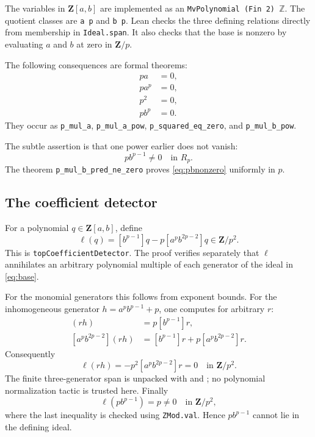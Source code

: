 \documentclass[11pt]{article}
\newcommand{\Z}{\mathbf Z}
\begin{document}
The variables in $\Z[a,b]$ are implemented as an
\texttt{MvPolynomial (Fin 2) \(\mathbb Z\)}.  The quotient classes are
\texttt{a p} and \texttt{b p}.  Lean checks the three defining relations
directly from membership in \texttt{Ideal.span}.  It also checks that the
base is nonzero by evaluating $a$ and $b$ at zero in $\Z/p$.

The following consequences are formal theorems:
\begin{align*}
 pa&=0,\\
 pa^p&=0,\\
 p^2&=0,\\
 pb^p&=0.
\end{align*}
They occur as \texttt{p\_mul\_a}, \texttt{p\_mul\_a\_pow},
\texttt{p\_squared\_eq\_zero}, and \texttt{p\_mul\_b\_pow}.

The subtle assertion is that one power earlier does not vanish:
\begin{equation}\label{eq:pbnonzero}
 p b^{p-1}\neq0\quad\text{in }R_p.
\end{equation}
The theorem \texttt{p\_mul\_b\_pred\_ne\_zero} proves
\eqref{eq:pbnonzero} uniformly in $p$.

\subsection{The coefficient detector}

For a polynomial $q\in\Z[a,b]$, define
\begin{equation}\label{eq:detector}
 \ell(q)=
 [b^{p-1}]q-p[a^pb^{2p-2}]q\in\Z/p^2.
\end{equation}
This is \texttt{topCoefficientDetector}.  The proof verifies separately that
$\ell$ annihilates an arbitrary polynomial multiple of each generator of the
ideal in \eqref{eq:base}.

For the monomial generators this follows from exponent bounds.  For the
inhomogeneous generator $h=a^pb^{p-1}+p$, one computes for arbitrary $r$:
\begin{align*}
 [b^{p-1}](rh)&=p[b^{p-1}]r,\\
 [a^pb^{2p-2}](rh)&=[b^{p-1}]r
   +p[a^pb^{2p-2}]r.
\end{align*}
Consequently
\[
 \ell(rh)=-p^2[a^pb^{2p-2}]r=0\quad\text{in }\Z/p^2.
\]
The finite three-generator span is unpacked with
 and
; no polynomial normalization tactic is
trusted here.  Finally
\[
 \ell(pb^{p-1})=p\neq0\quad\text{in }\Z/p^2,
\]
where the last inequality is checked using \texttt{ZMod.val}.  Hence
$pb^{p-1}$ cannot lie in the defining ideal.
\end{document}
